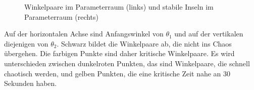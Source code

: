 \begin{figure}
\begin{minipage}{0.45\textwidth}
    \end{minipage}
    \caption{Winkelpaare im Parameterraum (links) und stabile Inseln im Parameterraum (rechts)}
    \label{fig:Parameterraum}
    \cite{doppelpendel:wettbewerbsarbeit}
\end{figure}
Auf der horizontalen Achse sind Anfangswinkel von \(\theta_1\) und
auf der vertikalen diejenigen von \(\theta_2\).
Schwarz bildet die Winkelpaare ab, die nicht ins Chaos übergehen.
Die farbigen Punkte sind daher kritische Winkelpaare.
Es wird unterschieden zwischen dunkelroten Punkten,
das sind Winkelpaare, die schnell chaotisch werden, und
gelben Punkten, die eine kritische Zeit nahe an 30 Sekunden haben. 